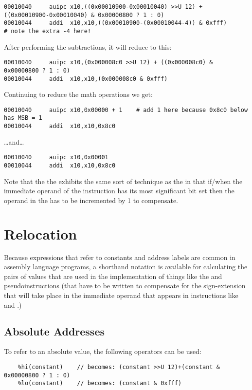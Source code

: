 {\small
\begin{verbatim}
00010040     auipc x10,((0x00010900-0x00010040) >>U 12) + ((0x00010900-0x00010040) & 0x00000800 ? 1 : 0)
00010044     addi  x10,x10,((0x00010900-(0x00010044-4)) & 0xfff)      # note the extra -4 here!
\end{verbatim}
}
After performing the subtractions, it will reduce to this:
{\small
\begin{verbatim}
00010040     auipc x10,(0x000008c0 >>U 12) + ((0x000008c0) & 0x00000800 ? 1 : 0)
00010044     addi  x10,x10,(0x000008c0 & 0xfff)
\end{verbatim}
}
Continuing to reduce the math operations we get:
{\small
\begin{verbatim}
00010040     auipc x10,0x00000 + 1    # add 1 here because 0x8c0 below has MSB = 1
00010044     addi  x10,x10,0x8c0
\end{verbatim}
}

\ldots and\ldots

{\small
\begin{verbatim}
00010040     auipc x10,0x00001
00010044     addi  x10,x10,0x8c0
\end{verbatim}
}

Note that the the \verb@la@ exhibits the same sort of technique as the \verb@li@ in that
if/when the immediate operand of the \verb@addi@ instruction has its most significant 
bit set then the operand in the \verb@auipc@ has to be incremented by 1 to compensate.



\section{Relocation}
 
Because expressions that refer to constants and address labels are common in 
assembly language programs, a shorthand notation is available for calculating 
the pairs of values that are used in the implementation of things like the 
\verb@li@ and \verb@la@ pseudoinstructions (that have to be written to 
compensate for the sign-extension that will take place in the immediate operand 
that appears in instructions like \verb@addi@ and \verb@jalr@.)

\subsection{Absolute Addresses}

To refer to an absolute value, the following operators can be used:
{\small
\begin{verbatim}
    %hi(constant)    // becomes: (constant >>U 12)+(constant & 0x00000800 ? 1 : 0)
    %lo(constant)    // becomes: (constant & 0xfff)
\end{verbatim}
}


